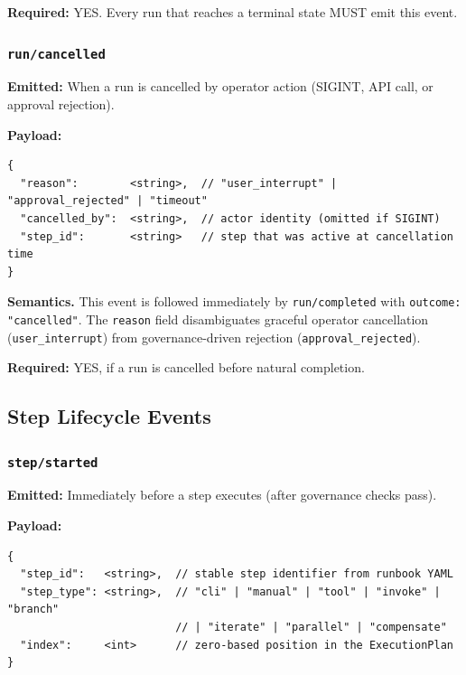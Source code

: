 \textbf{Required:} YES. Every run that reaches a terminal state MUST emit this event.


\subsubsection{\texttt{run/cancelled}}

\textbf{Emitted:} When a run is cancelled by operator action (SIGINT, API call, or approval rejection).

\textbf{Payload:}
\begin{verbatim}
{
  "reason":        <string>,  // "user_interrupt" | "approval_rejected" | "timeout"
  "cancelled_by":  <string>,  // actor identity (omitted if SIGINT)
  "step_id":       <string>   // step that was active at cancellation time
}
\end{verbatim}

\textbf{Semantics.} This event is followed immediately by \texttt{run/completed} with \texttt{outcome: "cancelled"}. The \texttt{reason} field disambiguates graceful operator cancellation (\texttt{user\_interrupt}) from governance-driven rejection (\texttt{approval\_rejected}).

\textbf{Required:} YES, if a run is cancelled before natural completion.


\subsection{Step Lifecycle Events}

\subsubsection{\texttt{step/started}}

\textbf{Emitted:} Immediately before a step executes (after governance checks pass).

\textbf{Payload:}
\begin{verbatim}
{
  "step_id":   <string>,  // stable step identifier from runbook YAML
  "step_type": <string>,  // "cli" | "manual" | "tool" | "invoke" | "branch"
                          // | "iterate" | "parallel" | "compensate"
  "index":     <int>      // zero-based position in the ExecutionPlan
}
\end{verbatim}

